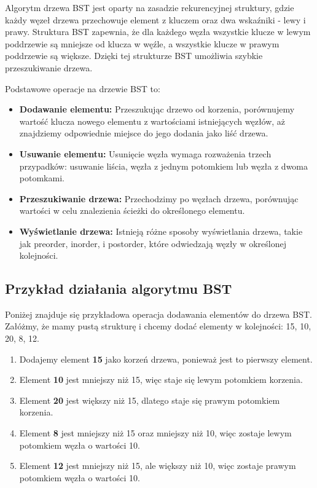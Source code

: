 Algorytm drzewa BST jest oparty na zasadzie rekurencyjnej struktury, gdzie każdy węzeł drzewa przechowuje element z kluczem oraz dwa wskaźniki - lewy i prawy. Struktura BST zapewnia, że dla każdego węzła wszystkie klucze w lewym poddrzewie są mniejsze od klucza w węźle, a wszystkie klucze w prawym poddrzewie są większe. Dzięki tej strukturze BST umożliwia szybkie przeszukiwanie drzewa.

Podstawowe operacje na drzewie BST to:
\begin{itemize}
  \item \textbf{Dodawanie elementu:} Przeszukując drzewo od korzenia, porównujemy wartość klucza nowego elementu z wartościami istniejących węzłów, aż znajdziemy odpowiednie miejsce do jego dodania jako liść drzewa.
  \item \textbf{Usuwanie elementu:} Usunięcie węzła wymaga rozważenia trzech przypadków: usuwanie liścia, węzła z jednym potomkiem lub węzła z dwoma potomkami.
  \item \textbf{Przeszukiwanie drzewa:} Przechodzimy po węzłach drzewa, porównując wartości w celu znalezienia ścieżki do określonego elementu.
  \item \textbf{Wyświetlanie drzewa:} Istnieją różne sposoby wyświetlania drzewa, takie jak preorder, inorder, i postorder, które odwiedzają węzły w określonej kolejności.
\end{itemize}

\subsection{Przykład działania algorytmu BST}

Poniżej znajduje się przykładowa operacja dodawania elementów do drzewa BST. Załóżmy, że mamy pustą strukturę i chcemy dodać elementy w kolejności: 15, 10, 20, 8, 12.

\begin{enumerate}
  \item Dodajemy element \textbf{15} jako korzeń drzewa, ponieważ jest to pierwszy element.
  \item Element \textbf{10} jest mniejszy niż 15, więc staje się lewym potomkiem korzenia.
  \item Element \textbf{20} jest większy niż 15, dlatego staje się prawym potomkiem korzenia.
  \item Element \textbf{8} jest mniejszy niż 15 oraz mniejszy niż 10, więc zostaje lewym potomkiem węzła o wartości 10.
  \item Element \textbf{12} jest mniejszy niż 15, ale większy niż 10, więc zostaje prawym potomkiem węzła o wartości 10.
\end{enumerate}

